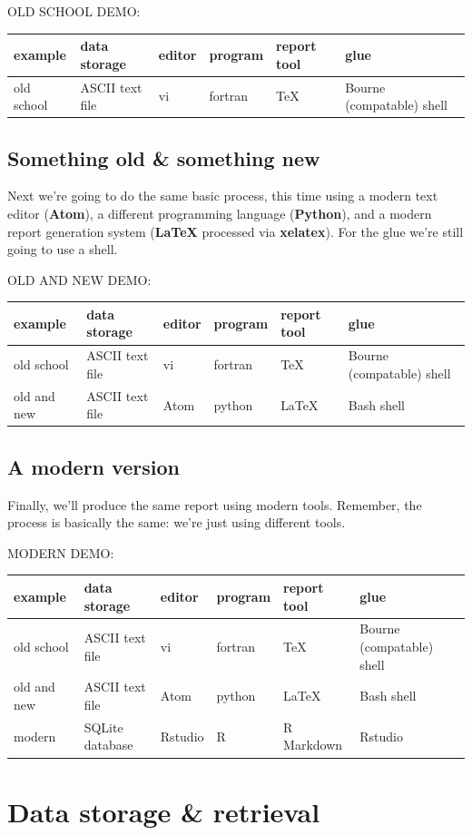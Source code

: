\documentclass[]{book}
\begin{document}
OLD SCHOOL DEMO:

\begin{longtable}[]{@{}llllll@{}}
\toprule
example & data storage & editor & program & report tool &
glue\tabularnewline
\midrule
\endhead
old school & ASCII text file & vi & fortran & TeX & Bourne (compatable)
shell\tabularnewline
\bottomrule
\end{longtable}

\subsection{Something old \& something
new}\label{something-old-something-new}

Next we're going to do the same basic process, this time using a modern
text editor (\textbf{Atom}), a different programming language
(\textbf{Python}), and a modern report generation system (\textbf{LaTeX}
processed via \textbf{xelatex}). For the glue we're still going to use a
shell.

OLD AND NEW DEMO:

\begin{longtable}[]{@{}llllll@{}}
\toprule
example & data storage & editor & program & report tool &
glue\tabularnewline
\midrule
\endhead
old school & ASCII text file & vi & fortran & TeX & Bourne (compatable)
shell\tabularnewline
old and new & ASCII text file & Atom & python & LaTeX & Bash
shell\tabularnewline
\bottomrule
\end{longtable}

\subsection{A modern version}\label{a-modern-version}

Finally, we'll produce the same report using modern tools. Remember, the
process is basically the same: we're just using different tools.

MODERN DEMO:

\begin{longtable}[]{@{}llllll@{}}
\toprule
example & data storage & editor & program & report tool &
glue\tabularnewline
\midrule
\endhead
old school & ASCII text file & vi & fortran & TeX & Bourne (compatable)
shell\tabularnewline
old and new & ASCII text file & Atom & python & LaTeX & Bash
shell\tabularnewline
modern & SQLite database & Rstudio & R & R Markdown &
Rstudio\tabularnewline
\bottomrule
\end{longtable}

\section{Data storage \& retrieval}\label{data-storage-retrieval}
\end{document}
